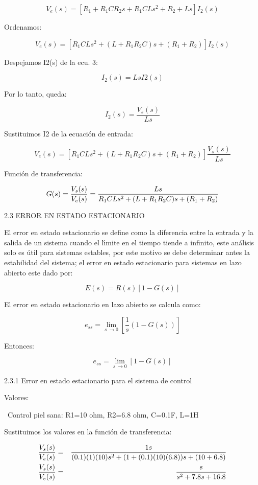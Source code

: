 \documentclass{article}
\begin{document}
\[
V_{e}(s)=[R_{1}+R_{1}CR_{2}s+R_{1}CLs^{2}+R_{2}+Ls]I_{2}(s)
\]

Ordenamos: 

\[
V_{e}(s)=[R_{1}CLs^{2}+(L+R_{1}R_{2}C)s+(R_{1}+R_{2})]I_{2}(s)
\]

Despejamos I2(s) de la ecu. 3: 

\[
I_{2}(s)=LsI2(s)
\]

Por lo tanto, queda: 

\[
I_{2}(s)=\frac{V_{s}(s)}{Ls}
\]

Sustituimos I2 de la ecuaci\'{o}n de entrada: 

\[
V_{e}(s)=[R_{1}CLs^{2}+(L+R_{1}R_{2}C)s+(R_{1}+R_{2})]\frac{V_{s}(s)}{Ls}
\]

Funci\'{o}n de transferencia: 

\[
G(s)=\frac{V_{s}(s)}{V_{e}(s)}=\frac{Ls}{%
R_{1}CLs^{2}+(L+R_{1}R_{2}C)s+(R_{1}+R_{2})}
\]

\bigskip 

2.3 ERROR EN ESTADO ESTACIONARIO 


El error en estado estacionario se define como la diferencia entre la
entrada y la salida de un sistema cuando el l\'{\i}mite en el tiempo tiende
a infinito, este an\'{a}lisis solo es \'{u}til para sistemas estables, por
este motivo se debe determinar antes la estabilidad del sistema; el error en
estado estacionario para sistemas en lazo abierto este dado por: 

\[
E(s)=R(s)[1-G(s)]
\]

El error en estado estacionario en lazo abierto se calcula como: 

\[
e_{ss}=\lim_{s\ \rightarrow 0}\left[ \frac{1}{s}(1-G(s))\right] 
\]

Entonces: 

\[
e_{ss}=\lim_{s\ \rightarrow 0}[1-G(s)]
\]

2.3.1 Error en estado estacionario para el sistema de control

Valores:

\bigskip\ Control piel sana: R1=10 ohm, R2=6.8 ohm, C=0.1F, L=1H


Sustituimos los valores en la funci\'{o}n de transferencia: 

\begin{eqnarray*}
\frac{V_{s}(s)}{V_{e}(s)} &=&\frac{1s}{%
(0.1)(1)(10)s^{2}+(1+(0.1)(10)(6.8))s+(10+6.8)} \\
\frac{V_{s}(s)}{V_{e}(s)} &=&\frac{s}{s^{2}+7.8s+16.8}
\end{eqnarray*}
\end{document}
